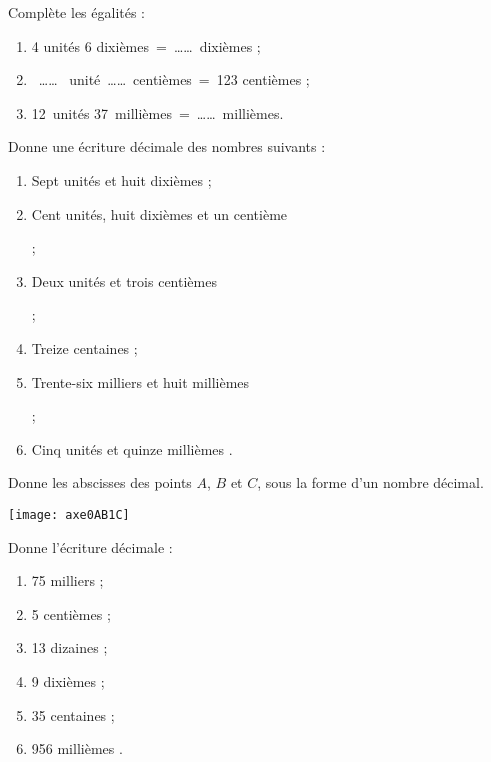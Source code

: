 \begin{exercice}
Complète les égalités :
\begin{enumerate}
 \item 4 unités 6 dixièmes = \ldots \ldots dixièmes ;
 \item  \ldots \ldots  unité \ldots \ldots centièmes = 123 centièmes ;
 \item 12 unités 37 millièmes = \ldots \ldots millièmes.
 \end{enumerate}
\end{exercice}


\begin{exercice}
Donne une écriture décimale des nombres suivants :
\begin{enumerate}
 \item Sept unités et huit dixièmes \dotfill ;
 \item Cent unités, huit dixièmes et un centième
 
 \dotfill ;
 \item Deux unités et trois centièmes
 
 \dotfill ;
 \item Treize centaines \dotfill ;
 \item Trente-six milliers et huit millièmes
 
 \dotfill ;
 \item Cinq unités et quinze millièmes \dotfill.
 \end{enumerate}
\end{exercice}


\begin{exercice}
Donne les abscisses des points $A$, $B$ et $C$, sous la forme d'un nombre décimal.
\begin{center} \texttt{[image: axe0AB1C]} \end{center}
\end{exercice}

\begin{exercice}
Donne l'écriture décimale :
\begin{enumerate} 
 \item 75 milliers \dotfill ; 

 \item 5 centièmes \dotfill ; 

 \item 13 dizaines \dotfill ; 

 \item 9 dixièmes \dotfill ; 

 \item 35 centaines \dotfill ;

 \item 956 millièmes \dotfill. 

 \end{enumerate}
\end{exercice}


